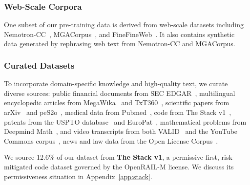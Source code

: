 \subsubsection{Web-Scale Corpora}
One subset of our pre-training data is derived from web-scale datasets including Nemotron-CC~\citep{su2025nemotroncc}, MGACorpus~\citep{hao2025reformulationpretrainingdataaugmentation}, and FineFineWeb~\citep{map2024finefineweb}. It also contains synthetic data generated by rephrasing web text from Nemotron-CC and MGACorpus.




\subsubsection{Curated Datasets}
To incorporate domain-specific knowledge and high-quality text, we curate diverse sources: public financial documents from SEC EDGAR~\citep{sec_edgar}, multilingual encyclopedic articles from MegaWika~\citep{barham2023megawikamillionsreportssources} and TxT360~\citep{txt360}, scientific papers from arXiv~\citep{clement2019use} and peS2o~\citep{peS2o}, medical data from Pubmed~\citep{PubMed}, code from The Stack v1~\citep{kocetkov2023the}, patents from the USPTO database~\citep{uspto} and EuroPat~\citep{heafield-etal-2022-europat}, mathematical problems from Deepmind Math~\citep{saxton2019analysingmathematicalreasoningabilities}, and video transcripts from both VALID~\citep{Huu2024VALID} and the YouTube Commons corpus~\citep{Langlais2024}, news and law data from the Open License Corpus~\citep{min2024silo}.

We source 12.6\% of our dataset from \textbf{The Stack v1}, a permissive-first, risk-mitigated code dataset governed by the OpenRAIL-M license. We discuss its permissiveness situation in Appendix~\ref{app:stack}.

